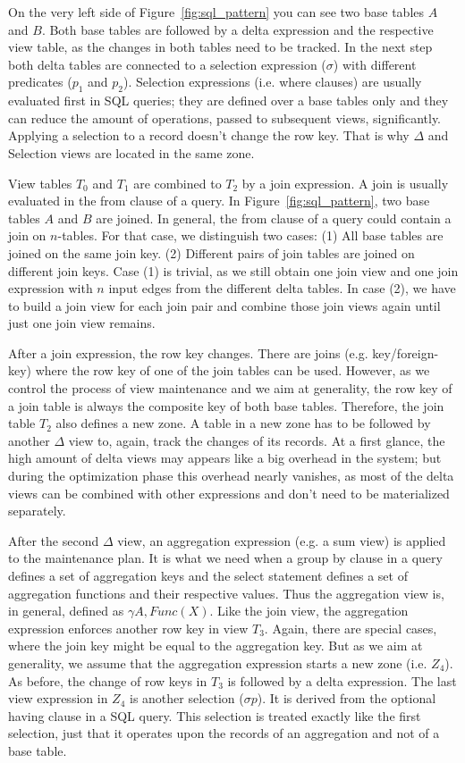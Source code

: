 On the very left side of Figure~\ref{fig:sql_pattern} you can see two 
base tables $A$ and $B$. Both base tables are followed by a delta 
expression and the respective view table, as the changes in both tables 
need to be tracked. In the next step both delta tables are connected to 
a selection expression ($\sigma$) with different predicates ($p_1$ and 
$p_2$). Selection expressions (i.e. where clauses) are usually evaluated 
first in SQL queries; they are defined over a base tables only and they 
can reduce the amount of operations, passed to subsequent views, 
significantly. Applying a selection to a record doesn't change the row 
key. That is why $\Delta$ and Selection views are located in the same 
zone. 

 View tables $T_0$ and $T_1$ are combined to $T_2$ by a join expression. 
A join is usually evaluated in the from clause of a query. In 
Figure~\ref{fig:sql_pattern}, two base tables $A$ and $B$ are joined. In 
general, the from clause of a query could contain a join on $n$-tables. 
For that case, we distinguish two cases: (1) All base tables are joined 
on the same join key. (2) Different pairs of join tables are joined on 
different join keys. Case (1) is trivial, as we still obtain one join 
view and one join expression with $n$ input edges from the different 
delta tables. In case (2), we have to build a join view for each join 
pair and combine those join views again until just one join view 
remains. 

After a join expression, the row key changes. There are joins (e.g. 
key/foreign-key) where the row key of one of the join tables can be 
used. However, as we control the process of view maintenance and we aim 
at generality, the row key of a join table is always the composite key 
of both base tables. Therefore, the join table $T_2$ also defines a new 
zone. A table in a new zone has to be followed by another $\Delta$ view 
to, again, track the changes of its records. At a first glance, the high 
amount of delta views may appears like a big overhead in the system; but 
during the optimization phase this overhead nearly vanishes, as most of 
the delta views can be combined with other expressions and don't need to 
be materialized separately. 

After the second $\Delta$ view, an aggregation expression (e.g. a sum 
view) is applied to the maintenance plan. It is what we need when a 
group by clause in a query defines a set of aggregation keys and the 
select statement defines a set of aggregation functions and their 
respective values. Thus the aggregation view is, in general, defined as 
$\gamma A,Func(X)$. Like the join view, the aggregation expression 
enforces another row key in view $T_3$. Again, there are special cases, 
where the join key might be equal to the aggregation key. But as we aim 
at generality, we assume that the aggregation expression starts a new 
zone (i.e. $Z_4$). As before, the change of row keys in $T_3$ is 
followed by a delta expression. The last view expression in $Z_4$ is 
another selection ($\sigma p$). It is derived from the optional having 
clause in a SQL query. This selection is treated exactly like the first 
selection, just that it operates upon the records of an aggregation and 
not of a base table. 

